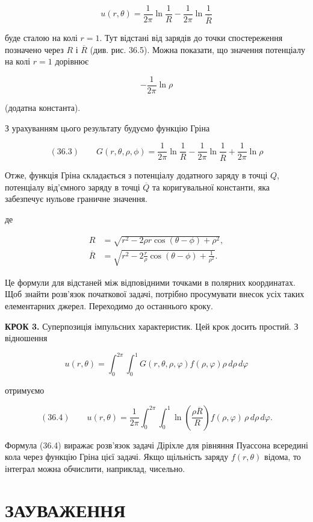 \documentclass[
  ukrainian,
]{article}
\begin{document}
\[
u(r, \theta) = \frac{1}{2\pi} \ln \frac{1}{R} - \frac{1}{2\pi} \ln \frac{1}{\overline{R}}
\]

буде сталою на колі \(r=1\). Тут відстані від зарядів до точки
спостереження позначено через \(R\) і \(\overline{R}\) (див. рис. 36.5).
Можна показати, що значення потенціалу на колі \(r=1\) дорівнює

\[
-\frac{1}{2\pi}\ln\rho
\]

(додатна константа).

З урахуванням цього результату будуємо функцію Гріна

\[
(36.3)\qquad G(r, \theta, \rho, \phi) =\frac{1}{2\pi} \ln \frac{1}{R}- \frac{1}{2\pi} \ln \frac{1}{\overline{R}}+ \frac{1}{2\pi} \ln \rho
\]

Отже, функція Гріна складається з потенціалу додатного заряду в точці
\(Q\), потенціалу від'ємного заряду в точці \(\overline{Q}\) та
коригувальної константи, яка забезпечує нульове граничне значення.

де

\[
\begin{aligned}R &= \sqrt{r^2 - 2\rho r \cos(\theta - \phi) + \rho^2},\\\overline{R} &= \sqrt{r^2 - 2\frac{r}{\rho}\cos(\theta - \phi) + \frac{1}{\rho^2}}.\end{aligned}
\]

Це формули для відстаней між відповідними точками в полярних
координатах. Щоб знайти розв'язок початкової задачі, потрібно
просумувати внесок усіх таких елементарних джерел. Переходимо до
останнього кроку.

\textbf{КРОК 3.} Суперпозиція імпульсних характеристик. Цей крок досить
простий. З відношення

\[
u(r, \theta) = \int_{0}^{2\pi} \int_{0}^{1} G(r, \theta, \rho, \varphi) f(\rho, \varphi) \rho\, d\rho\, d\varphi
\]

отримуємо

\[
(36.4)\qquad u(r, \theta) = \frac{1}{2\pi} \int_{0}^{2\pi} \int_{0}^{1}\ln \left(\frac{\rho \overline{R}}{R}\right) f(\rho, \varphi)\,\rho\, d\rho\, d\varphi.
\]

Формула (36.4) виражає розв'язок задачі Діріхле для рівняння Пуассона
всередині кола через функцію Гріна цієї задачі. Якщо щільність заряду
\(f(r, \theta)\) відома, то інтеграл можна обчислити, наприклад,
чисельно.

\section{ЗАУВАЖЕННЯ}\label{ux437ux430ux443ux432ux430ux436ux435ux43dux43dux44f-11}
\end{document}
